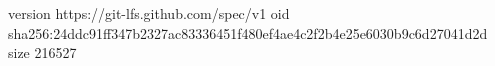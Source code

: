 version https://git-lfs.github.com/spec/v1
oid sha256:24ddc91ff347b2327ac83336451f480ef4ae4c2f2b4e25e6030b9c6d27041d2d
size 216527
